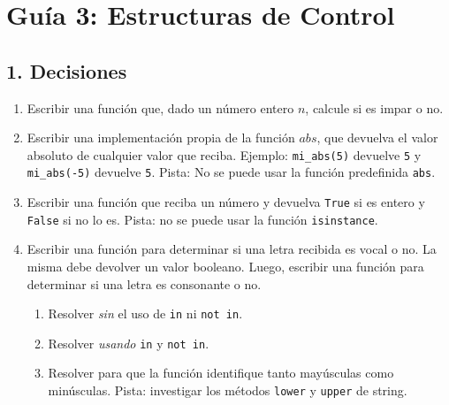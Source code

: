 \documentclass[
  letterpaper,
  DIV=11,
  numbers=noendperiod]{scrreprt}
\providecommand{\tightlist}{%
  \setlength{\itemsep}{0pt}\setlength{\parskip}{0pt}}\usepackage{longtable,booktabs,array}
\begin{document}
\hypertarget{guuxeda-3-estructuras-de-control}{%
\section*{Guía 3: Estructuras de
Control}\label{guuxeda-3-estructuras-de-control}}


\hypertarget{decisiones-1}{%
\subsection*{1. Decisiones}\label{decisiones-1}}

\begin{enumerate}
\def\labelenumi{\arabic{enumi}.}
\item
  Escribir una función que, dado un número entero \(n\), calcule si es
  impar o no.
\item
  Escribir una implementación propia de la función \(abs\), que devuelva
  el valor absoluto de cualquier valor que reciba. Ejemplo:
  \texttt{mi\_abs(5)} devuelve \texttt{5} y \texttt{mi\_abs(-5)}
  devuelve \texttt{5}. Pista: No se puede usar la función predefinida
  \texttt{abs}.
\item
  Escribir una función que reciba un número y devuelva \texttt{True} si
  es entero y \texttt{False} si no lo es. Pista: no se puede usar la
  función \texttt{isinstance}.
\item
  Escribir una función para determinar si una letra recibida es vocal o
  no. La misma debe devolver un valor booleano. Luego, escribir una
  función para determinar si una letra es consonante o no.

  \begin{enumerate}
  \def\labelenumii{\alph{enumii}.}
  \tightlist
  \item
    Resolver \emph{sin} el uso de \texttt{in} ni \texttt{not\ in}.
  \item
    Resolver \emph{usando} \texttt{in} y \texttt{not\ in}.
  \item
    Resolver para que la función identifique tanto mayúsculas como
    minúsculas. Pista: investigar los métodos \texttt{lower} y
    \texttt{upper} de string.
  \end{enumerate}
\end{enumerate}
\end{document}
